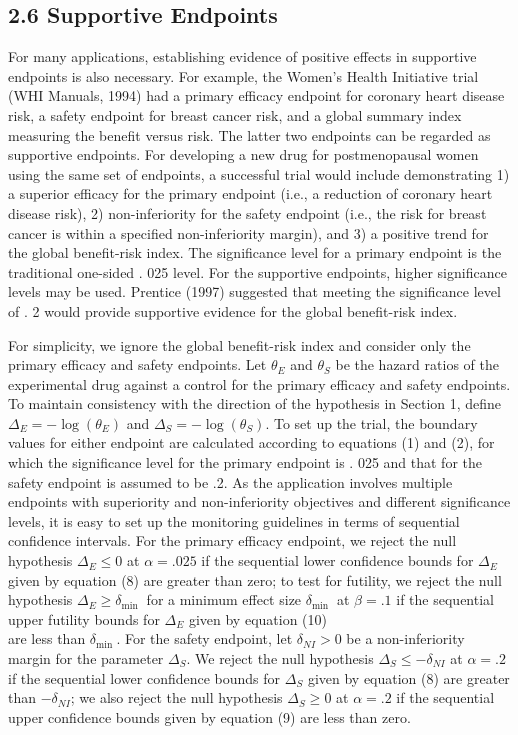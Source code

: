 \documentclass[10pt]{article}
\begin{document}
\subsection*{2.6 Supportive Endpoints}
For many applications, establishing evidence of positive effects in supportive endpoints is also necessary. For example, the Women's Health Initiative trial (WHI Manuals, 1994) had a primary efficacy endpoint for coronary heart disease risk, a safety endpoint for breast cancer risk, and a global summary index\\
measuring the benefit versus risk. The latter two endpoints can be regarded as supportive endpoints. For developing a new drug for postmenopausal women using the same set of endpoints, a successful trial would include demonstrating 1) a superior efficacy for the primary endpoint (i.e., a reduction of coronary heart disease risk), 2) non-inferiority for the safety endpoint (i.e., the risk for breast cancer is within a specified non-inferiority margin), and 3) a positive trend for the global benefit-risk index. The significance level for a primary endpoint is the traditional one-sided . 025 level. For the supportive endpoints, higher significance levels may be used. Prentice (1997) suggested that meeting the significance level of . 2 would provide supportive evidence for the global benefit-risk index.

For simplicity, we ignore the global benefit-risk index and consider only the primary efficacy and safety endpoints. Let $\theta_{E}$ and $\theta_{S}$ be the hazard ratios of the experimental drug against a control for the primary efficacy and safety endpoints. To maintain consistency with the direction of the hypothesis in Section 1, define $\Delta_{E}=-\log \left(\theta_{E}\right)$ and $\Delta_{S}=-\log \left(\theta_{S}\right)$. To set up the trial, the boundary values for either endpoint are calculated according to equations (1) and (2), for which the significance level for the primary endpoint is . 025 and that for the safety endpoint is assumed to be .2. As the application involves multiple endpoints with superiority and non-inferiority objectives and different significance levels, it is easy to set up the monitoring guidelines in terms of sequential confidence intervals. For the primary efficacy endpoint, we reject the null hypothesis $\Delta_{E} \leq 0$ at $\alpha=.025$ if the sequential lower confidence bounds for $\Delta_{E}$ given by equation (8) are greater than zero; to test for futility, we reject the null hypothesis $\Delta_{E} \geq \delta_{\text {min }}$ for a minimum effect size $\delta_{\text {min }}$ at $\beta=.1$ if the sequential upper futility bounds for $\Delta_{E}$ given by equation (10)\\
are less than $\delta_{\text {min }}$. For the safety endpoint, let $\delta_{N I}>0$ be a non-inferiority margin for the parameter $\Delta_{S}$. We reject the null hypothesis $\Delta_{S} \leq-\delta_{N I}$ at $\alpha=.2$ if the sequential lower confidence bounds for $\Delta_{S}$ given by equation (8) are greater than $-\delta_{N I}$; we also reject the null hypothesis $\Delta_{S} \geq 0$ at $\alpha=.2$ if the sequential upper confidence bounds given by equation (9) are less than zero.
\end{document}
